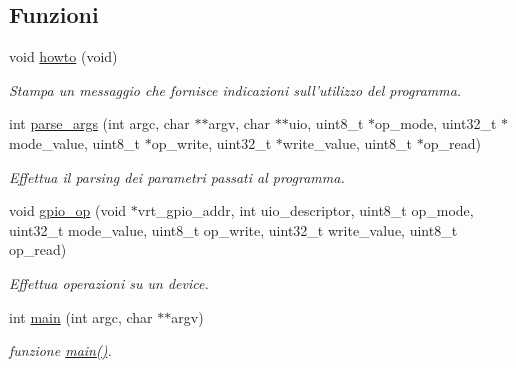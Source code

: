 \subsection*{Funzioni}
\begin{DoxyCompactItemize}
\item 
void \hyperlink{uio-int_8c_a05909651fa170a63e98e3f8e13451b7b}{howto} (void)
\begin{DoxyCompactList}\small\item\em Stampa un messaggio che fornisce indicazioni sull'utilizzo del programma. \end{DoxyCompactList}\item 
int \hyperlink{uio-int_8c_ab6b18eb1bf7bc996599c06dc6dad8f53}{parse\+\_\+args} (int argc, char $\ast$$\ast$argv, char $\ast$$\ast$uio, uint8\+\_\+t $\ast$op\+\_\+mode, uint32\+\_\+t $\ast$mode\+\_\+value, uint8\+\_\+t $\ast$op\+\_\+write, uint32\+\_\+t $\ast$write\+\_\+value, uint8\+\_\+t $\ast$op\+\_\+read)
\begin{DoxyCompactList}\small\item\em Effettua il parsing dei parametri passati al programma. \end{DoxyCompactList}\item 
void \hyperlink{uio-int_8c_a78b676750c5d08c316cad35ec3963c53}{gpio\+\_\+op} (void $\ast$vrt\+\_\+gpio\+\_\+addr, int uio\+\_\+descriptor, uint8\+\_\+t op\+\_\+mode, uint32\+\_\+t mode\+\_\+value, uint8\+\_\+t op\+\_\+write, uint32\+\_\+t write\+\_\+value, uint8\+\_\+t op\+\_\+read)
\begin{DoxyCompactList}\small\item\em Effettua operazioni su un device. \end{DoxyCompactList}\item 
int \hyperlink{uio-int_8c_a3c04138a5bfe5d72780bb7e82a18e627}{main} (int argc, char $\ast$$\ast$argv)
\begin{DoxyCompactList}\small\item\em funzione \hyperlink{uio-int_8c_a3c04138a5bfe5d72780bb7e82a18e627}{main()}. \end{DoxyCompactList}\end{DoxyCompactItemize}


